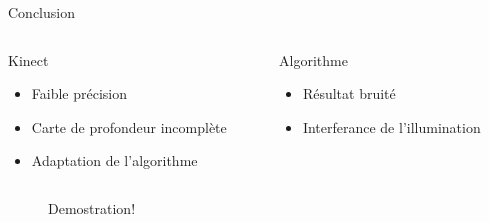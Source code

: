 \documentclass[compress,pdf,11pt,xcolor=dvipsnames]{beamer}
\begin{document}
\begin{frame}{Conclusion}
  
  \begin{columns}
    \begin{column}{0.5\textwidth}
      
      \begin{beamerboxesrounded}[shadow=true]{Kinect}
        \begin{itemize}
        \item Faible précision
        \item Carte de profondeur incomplète
        \item Adaptation de l'algorithme
        \end{itemize}
      \end{beamerboxesrounded}
    \end{column}    
    
    \begin{column}{0.5\textwidth}
      \begin{beamerboxesrounded}[shadow=true]{Algorithme}

        \begin{itemize}
        \item Résultat bruité 
        \item Interferance de l'illumination
        \end{itemize}

      \end{beamerboxesrounded}

    \end{column}    
  \end{columns}    
  
\end{frame}


\begin{frame}{}
  \begin{figure}
    \begin{centering}
      \Huge Demostration!
      \par\end{centering}
  \end{figure}
\end{frame}
\end{document}
